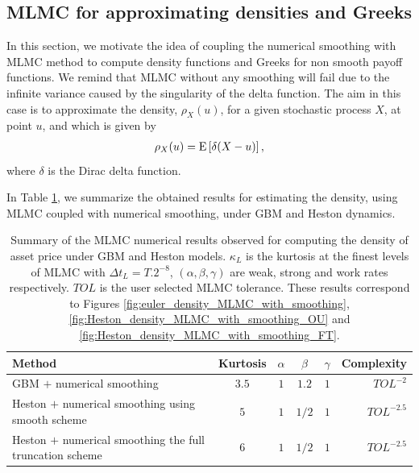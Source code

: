 \subsection{MLMC for approximating densities and Greeks}\label{sec: MLMC for approximating densities and greeks}
In this section, we motivate the idea of coupling the numerical smoothing  with MLMC method to compute density functions and Greeks for non smooth payoff functions. We remind that MLMC without any smoothing  will fail due to the infinite variance caused by the singularity of  the delta function. The aim in this case is to approximate the density, $\rho_{X}(u)$, for a given stochastic process $X$, at point $u$, and which is given by 
\begin{align}
\rho_{X}(u)=\mathrm{E}\left[\delta(X-u)\right],
\end{align}
where $\delta$ is the Dirac delta function.


In Table \ref{table:Summary of our numerical results density.}, we summarize the obtained results for estimating the density, using MLMC coupled with numerical smoothing, under GBM and Heston dynamics. 
\FloatBarrier

\begin{table}[!h]
	\centering
	\begin{small}
	\begin{tabular}{l*{4}{c}r}
	\toprule[1.5pt]
		Method      &   Kurtosis & $\alpha$   &  $\beta$  &  $\gamma$   & Complexity \\
		\hline
			GBM $+$ numerical smoothing & $3.5$ & $1$  &  $1.2$&  $1$&  $TOL^{-2}$\\	
              \hline 
           Heston $+$ numerical smoothing  using smooth scheme & $5$ & $1$  &  $1/2$ & $1$ &  $TOL^{-2.5}$\\	
               \hline
            Heston $+$ numerical smoothing  the full truncation scheme & $6$ & $1$  &  $1/2$&  $1$ &  $TOL^{-2.5}$\\	
		\bottomrule[1.25pt]
	\end{tabular}
\end{small}
	\caption{Summary of the MLMC numerical results observed for  computing the density of asset price under GBM and   Heston models. $\kappa_{L}$ is the kurtosis at the finest levels of MLMC with $\Delta t_{L}=T.2^{-8}$, $(\alpha,\beta,\gamma)$ are weak, strong and work rates respectively. $TOL$ is the user selected  MLMC  tolerance. These results correspond to Figures \ref{fig:euler_density_MLMC_with_smoothing}, \ref{fig:Heston_density_MLMC_with_smoothing_OU} and \ref{fig:Heston_density_MLMC_with_smoothing_FT}.}
	\label{table:Summary of our numerical results density.}
\end{table}
\FloatBarrier

